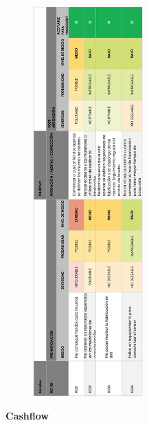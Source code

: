 \begin{figure}[H]
  \centering
    \includegraphics[width=0.38\textwidth]{Figuras/MatRiesgos}
  \label{fig:MatRiesgos}
\end{figure}
\newpage 
\begin{flushleft}
{\Large \textbf{Cashflow}}
\end{flushleft}
